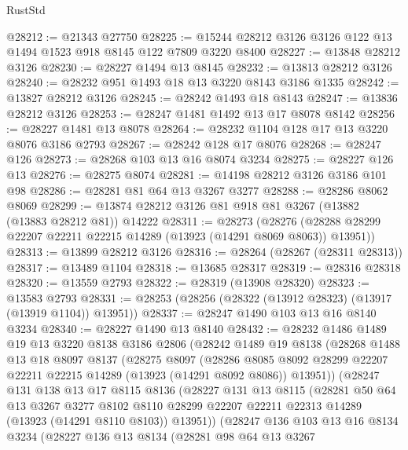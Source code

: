 \begin{lexlean}{RustStd}
\begin{coremodule}
@28212 := @21343 @27750
@28225 := @15244 @28212 @3126 @3126 @122 @13 @1494 @1523 @918 @8145 @122 @7809 @3220 @8400
@28227 := @13848 @28212 @3126
@28230 := @28227 @1494 @13 @8145
@28232 := @13813 @28212 @3126
@28240 := @28232 @951 @1493 @18 @13 @3220 @8143 @3186 @1335
@28242 := @13827 @28212 @3126
@28245 := @28242 @1493 @18 @8143
@28247 := @13836 @28212 @3126
@28253 := @28247 @1481 @1492 @13 @17 @8078 @8142
@28256 := @28227 @1481 @13 @8078
@28264 := @28232 @1104 @128 @17 @13 @3220 @8076 @3186 @2793
@28267 := @28242 @128 @17 @8076
@28268 := @28247 @126
@28273 := @28268 @103 @13 @16 @8074 @3234
@28275 := @28227 @126 @13
@28276 := @28275 @8074
@28281 := @14198 @28212 @3126 @3186 @101 @98
@28286 := @28281 @81 @64 @13 @3267 @3277
@28288 := @28286 @8062 @8069
@28299 := @13874 @28212 @3126 @81 @918 @81 @3267 (@13882 (@13883 @28212 @81)) @14222
@28311 := @28273
    (@28276 (@28288 @28299 @22207 @22211 @22215 @14289 (@13923 (@14291 @8069 @8063)) @13951))
@28313 := @13899 @28212 @3126
@28316 := @28264 (@28267 (@28311 @28313))
@28317 := @13489 @1104
@28318 := @13685 @28317
@28319 := @28316 @28318
@28320 := @13559 @2793
@28322 := @28319 (@13908 @28320)
@28323 := @13583 @2793
@28331 := @28253 (@28256 (@28322 (@13912 @28323) (@13917 (@13919 @1104)) @13951))
@28337 := @28247 @1490 @103 @13 @16 @8140 @3234
@28340 := @28227 @1490 @13 @8140
@28432 := @28232
    @1486
    @1489
    @19
    @13
    @3220
    @8138
    @3186
    @2806
    (@28242
      @1489
      @19
      @8138
      (@28268
        @1488
        @13
        @18
        @8097
        @8137
        (@28275
          @8097
          (@28286
            @8085
            @8092
            @28299
            @22207
            @22211
            @22215
            @14289
            (@13923 (@14291 @8092 @8086))
            @13951))
        (@28247
          @131
          @138
          @13
          @17
          @8115
          @8136
          (@28227
            @131
            @13
            @8115
            (@28281
              @50
              @64
              @13
              @3267
              @3277
              @8102
              @8110
              @28299
              @22207
              @22211
              @22313
              @14289
              (@13923 (@14291 @8110 @8103))
              @13951))
          (@28247
            @136
            @103
            @13
            @16
            @8134
            @3234
            (@28227
              @136
              @13
              @8134
              (@28281
                @98
                @64
                @13
                @3267

\end{coremodule}
\end{lexlean}
